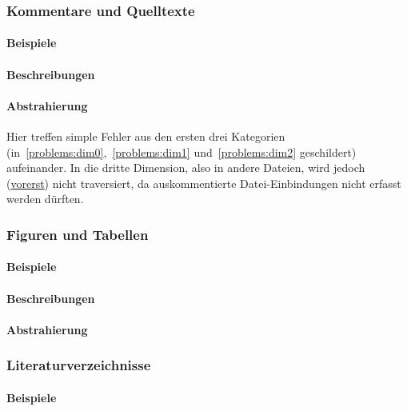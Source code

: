 \subsubsection{Kommentare und Quelltexte}\label{problems:advanced:comments}
\paragraph*{Beispiele}
\paragraph*{Beschreibungen}
\paragraph*{Abstrahierung}
Hier treffen simple Fehler aus den ersten drei Kategorien (in~\ref{problems:dim0},~\ref{problems:dim1} und~\ref{problems:dim2} geschildert) aufeinander. In die dritte Dimension, also in andere Dateien, wird jedoch (\hyperref[problems:special:comments]{vorerst}) nicht traversiert, da auskommentierte Datei-Einbindungen nicht erfasst werden dürften. 


\subsubsection{Figuren und Tabellen}\label{problems:advanced:tables}
\paragraph*{Beispiele}
\paragraph*{Beschreibungen}
\paragraph*{Abstrahierung}

\subsubsection{Literaturverzeichnisse}\label{problems:advanced:bibtex}
\paragraph*{Beispiele}
